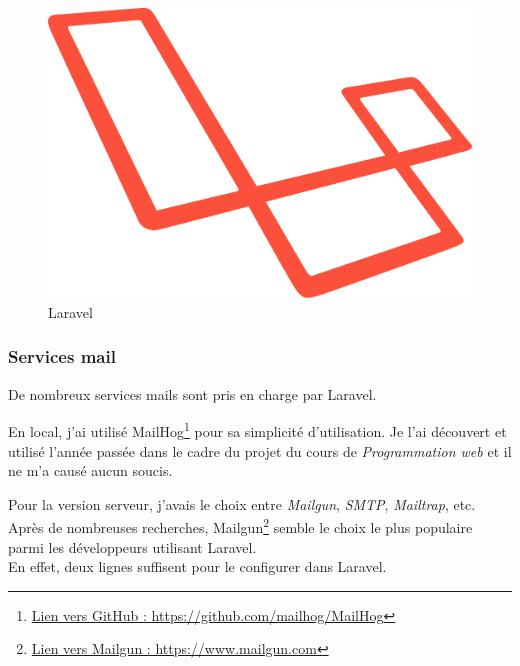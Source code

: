 \begin{figure}[h]
  \centering
  \includegraphics[scale=0.2]
  {textures/images/tools/laravel.pdf}
  \caption{Laravel}
  \label{fig:laravel}
\end{figure}


\subsubsection{Services mail}
\label{sec:services_mail}
De nombreux services mails sont pris en charge par Laravel.

En local, j'ai utilisé MailHog\footnote{\href{https://github.com/mailhog/MailHog}{Lien vers GitHub : https://github.com/mailhog/MailHog}} pour sa simplicité d'utilisation. Je l'ai découvert et utilisé l'année passée dans le cadre du projet du cours de \textit{Programmation web} et il ne m'a causé aucun soucis.

Pour la version serveur, j'avais le choix entre \textit{Mailgun}, \textit{SMTP}, \textit{Mailtrap}, etc.\\
Après de nombreuses recherches, Mailgun\footnote{\href{https://www.mailgun.com}{Lien vers Mailgun : https://www.mailgun.com}} semble le choix le plus populaire parmi les développeurs utilisant Laravel.\\
En effet, deux lignes suffisent pour le configurer dans Laravel.

\vspace{1cm}

